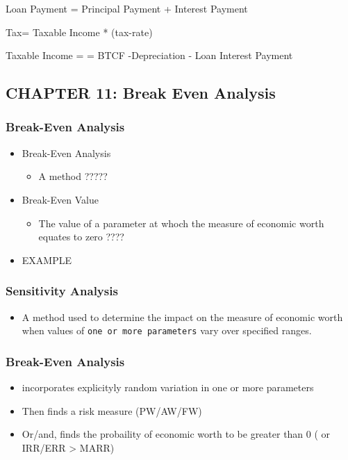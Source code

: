\documentclass[11pt]{article}
\begin{document}
Loan Payment = Principal Payment + Interest Payment

Tax= Taxable Income * (tax-rate)

Taxable Income =
= BTCF -Depreciation - Loan Interest Payment

\subsection{CHAPTER 11: Break Even Analysis}
\label{sec:orgheadline20}
\subsubsection{Break-Even Analysis}
\label{sec:orgheadline17}
\begin{itemize}
\item Break-Even Analysis
\begin{itemize}
\item A method ?????
\end{itemize}
\item Break-Even Value
\begin{itemize}
\item The value of a parameter at whoch the measure of economic worth equates to zero
????
\end{itemize}
\item EXAMPLE
\end{itemize}

\subsubsection{Sensitivity Analysis}
\label{sec:orgheadline18}
\begin{itemize}
\item A method used to determine the impact on the measure of economic worth when values of \texttt{one or more parameters} vary over specified ranges.
\end{itemize}
\subsubsection{Break-Even Analysis}
\label{sec:orgheadline19}
\begin{itemize}
\item incorporates explicityly random variation in one or more parameters

\item Then  finds a risk measure (PW/AW/FW)

\item Or/and, finds the probaility of economic worth to be greater than 0 ( or IRR/ERR > MARR)
\end{itemize}
\end{document}
